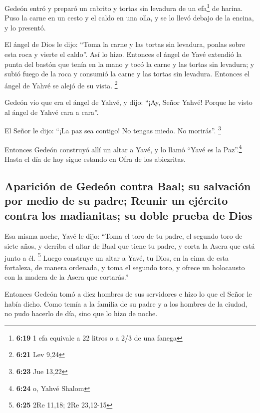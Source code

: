  Gedeón entró y preparó un cabrito y tortas sin levadura
de un efa\footnote{\textbf{6:19} 1 efa equivale a 22 litros o a 2/3 de
  una fanega} de harina. Puso la carne en un cesto y el caldo en una
olla, y se lo llevó debajo de la encina, y lo presentó.

 El ángel de Dios le dijo: ``Toma la carne y las tortas
sin levadura, ponlas sobre esta roca y vierte el caldo''. Así lo hizo.
 Entonces el ángel de Yavé extendió la punta del bastón
que tenía en la mano y tocó la carne y las tortas sin levadura; y subió
fuego de la roca y consumió la carne y las tortas sin levadura. Entonces
el ángel de Yahvé se alejó de su vista. \footnote{\textbf{6:21} Lev 9,24}

 Gedeón vio que era el ángel de Yahvé, y dijo: ``¡Ay,
Señor Yahvé! Porque he visto al ángel de Yahvé cara a cara''.

 El Señor le dijo: ``¡La paz sea contigo! No tengas
miedo. No morirás''. \footnote{\textbf{6:23} Jue 13,22}

 Entonces Gedeón construyó allí un altar a Yavé, y lo
llamó ``Yavé es la Paz''.\footnote{\textbf{6:24} o, Yahvé Shalom} Hasta
el día de hoy sigue estando en Ofra de los abiezritas.

\hypertarget{apariciuxf3n-de-gedeuxf3n-contra-baal-su-salvaciuxf3n-por-medio-de-su-padre-reunir-un-ejuxe9rcito-contra-los-madianitas-su-doble-prueba-de-dios}{%
\subsection{Aparición de Gedeón contra Baal; su salvación por medio de
su padre; Reunir un ejército contra los madianitas; su doble prueba de
Dios}\label{apariciuxf3n-de-gedeuxf3n-contra-baal-su-salvaciuxf3n-por-medio-de-su-padre-reunir-un-ejuxe9rcito-contra-los-madianitas-su-doble-prueba-de-dios}}

 Esa misma noche, Yavé le dijo: ``Toma el toro de tu
padre, el segundo toro de siete años, y derriba el altar de Baal que
tiene tu padre, y corta la Asera que está junto a él. \footnote{\textbf{6:25}
  2Re 11,18; 2Re 23,12-15}  Luego construye un altar a
Yavé, tu Dios, en la cima de esta fortaleza, de manera ordenada, y toma
el segundo toro, y ofrece un holocausto con la madera de la Asera que
cortarás.''

 Entonces Gedeón tomó a diez hombres de sus servidores e
hizo lo que el Señor le había dicho. Como temía a la familia de su padre
y a los hombres de la ciudad, no pudo hacerlo de día, sino que lo hizo
de noche.


